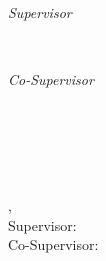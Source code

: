 \begin{titlepage}
	\begin{minipage}[t]{.27\textwidth}
		\raggedleft
		\textit{Supervisor}
	\end{minipage}
	\hspace*{15pt}
	\begin{minipage}[t]{.65\textwidth}
		\thesisFirstSupervisor
	\end{minipage} \\[10mm]
	\begin{minipage}[t]{.27\textwidth}
		\raggedleft
		\textit{Co-Supervisor}
	\end{minipage}
	\hspace*{15pt}
	\begin{minipage}[t]{.65\textwidth}
		\thesisSecondSupervisor
	\end{minipage} \\[10mm]

	\thesisDate \\

\end{titlepage}



\hfill
\vfill
{
	\small
	\textbf{\thesisName} \\
	\textit{\thesisTitle} \\
	\thesisSubject, \thesisDate \\
	Supervisor: \thesisFirstSupervisor \\
	Co-Supervisor: \thesisSecondSupervisor\\[1.5em]
	\textbf{\thesisUniversity} \\
	\thesisUniversityInstitute \\
	\thesisUniversityDepartment %
}